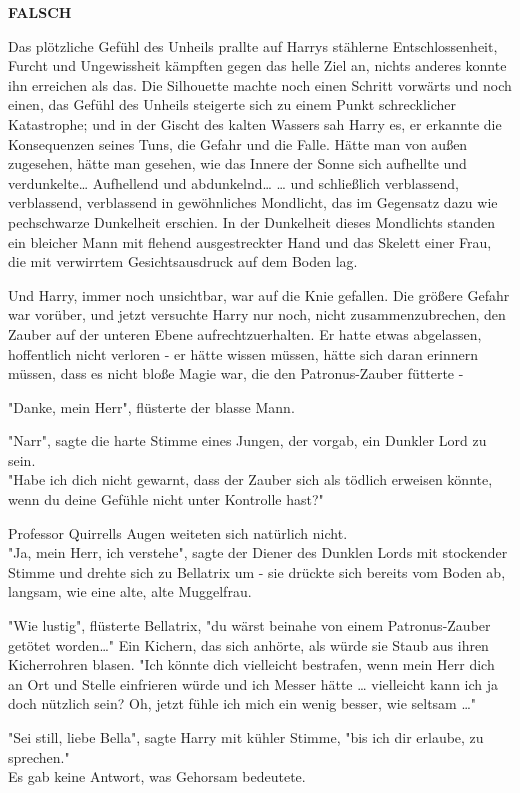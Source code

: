 {\textbf{FALSCH}

Das plötzliche Gefühl des Unheils prallte auf Harrys stählerne Entschlossenheit, Furcht und Ungewissheit kämpften gegen das helle Ziel an, nichts anderes konnte ihn erreichen als das. Die Silhouette machte noch einen Schritt vorwärts und noch einen, das Gefühl des Unheils steigerte sich zu einem Punkt schrecklicher Katastrophe; und in der Gischt des kalten Wassers sah Harry es, er erkannte die Konsequenzen seines Tuns, die Gefahr und die Falle. Hätte man von außen zugesehen, hätte man gesehen, wie das Innere der Sonne sich aufhellte und verdunkelte… Aufhellend und abdunkelnd… … und schließlich verblassend, verblassend, verblassend in gewöhnliches Mondlicht, das im Gegensatz dazu wie pechschwarze Dunkelheit erschien. In der Dunkelheit dieses Mondlichts standen ein bleicher Mann mit flehend ausgestreckter Hand und das Skelett einer Frau, die mit verwirrtem Gesichtsausdruck auf dem Boden lag.

Und Harry, immer noch unsichtbar, war auf die Knie gefallen. Die größere Gefahr war vorüber, und jetzt versuchte Harry nur noch, nicht zusammenzubrechen, den Zauber auf der unteren Ebene aufrechtzuerhalten. Er hatte etwas abgelassen, hoffentlich nicht verloren - er hätte wissen müssen, hätte sich daran erinnern müssen, dass es nicht bloße Magie war, die den Patronus-Zauber fütterte -

"Danke, mein Herr", flüsterte der blasse Mann.

"Narr", sagte die harte Stimme eines Jungen, der vorgab, ein Dunkler Lord zu sein.\\ "Habe ich dich nicht gewarnt, dass der Zauber sich als tödlich erweisen könnte, wenn du deine Gefühle nicht unter Kontrolle hast?"

Professor Quirrells Augen weiteten sich natürlich nicht.\\ "Ja, mein Herr, ich verstehe", sagte der Diener des Dunklen Lords mit stockender Stimme und drehte sich zu Bellatrix um - sie drückte sich bereits vom Boden ab, langsam, wie eine alte, alte Muggelfrau.

"Wie lustig", flüsterte Bellatrix, "du wärst beinahe von einem Patronus-Zauber getötet worden…" Ein Kichern, das sich anhörte, als würde sie Staub aus ihren Kicherrohren blasen. "Ich könnte dich vielleicht bestrafen, wenn mein Herr dich an Ort und Stelle einfrieren würde und ich Messer hätte … vielleicht kann ich ja doch nützlich sein? Oh, jetzt fühle ich mich ein wenig besser, wie seltsam …"

"Sei still, liebe Bella", sagte Harry mit kühler Stimme, "bis ich dir erlaube, zu sprechen."\\ Es gab keine Antwort, was Gehorsam bedeutete.

}
